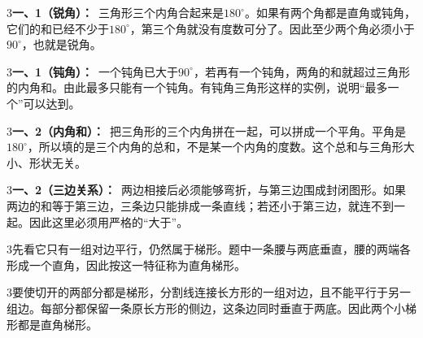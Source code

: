 \documentclass[multi=snippet,border={5bp 20bp 5bp 5bp}]{standalone}
\newenvironment{snippet}[3]{\begin{minipage}{#1bp}\color{answerred}\fontsize{#2}{#3}\selectfont\raggedright}{\end{minipage}}
\begin{document}
\begin{snippet}{505}{11.5}{14}\begin{multicols}{3}\raggedcolumns \textbf{一、1（锐角）：}\ 三角形三个内角合起来是\(180^\circ\)\allowbreak 。如果有两个角都是直角或钝角，它们的和已经不少于\(180^\circ\)\allowbreak ，第三个角就没有度数可分了。因此至少两个角必须小于\(90^\circ\)\allowbreak ，也就是锐角。\end{multicols}\end{snippet}
\begin{snippet}{505}{11.5}{14}\begin{multicols}{3}\raggedcolumns \textbf{一、1（钝角）：}\ 一个钝角已大于\(90^\circ\)\allowbreak ，若再有一个钝角，两角的和就超过三角形的内角和。由此最多只能有一个钝角。有钝角三角形这样的实例，说明“最多一个”可以达到。\end{multicols}\end{snippet}
\begin{snippet}{505}{11.5}{14}\begin{multicols}{3}\raggedcolumns \textbf{一、2（内角和）：}\ 把三角形的三个内角拼在一起，可以拼成一个平角。平角是\(180^\circ\)\allowbreak ，所以填的是三个内角的总和，不是某一个内角的度数。这个总和与三角形大小、形状无关。\end{multicols}\end{snippet}
\begin{snippet}{505}{11.5}{14}\begin{multicols}{3}\raggedcolumns \textbf{一、2（三边关系）：}\ 两边相接后必须能够弯折，与第三边围成封闭图形。如果两边的和等于第三边，三条边只能排成一条直线；若还小于第三边，就连不到一起。因此这里必须用严格的“大于”。\end{multicols}\end{snippet}
\begin{snippet}{505}{11.5}{14}\begin{multicols}{3}\raggedcolumns 先看它只有一组对边平行，仍然属于梯形。题中一条腰与两底垂直，腰的两端各形成一个直角，因此按这一特征称为直角梯形。\end{multicols}\end{snippet}
\begin{snippet}{505}{11.5}{14}\begin{multicols}{3}\raggedcolumns 要使切开的两部分都是梯形，分割线连接长方形的一组对边，且不能平行于另一组边。每部分都保留一条原长方形的侧边，这条边同时垂直于两底。因此两个小梯形都是直角梯形。\end{multicols}\end{snippet}
\end{document}
